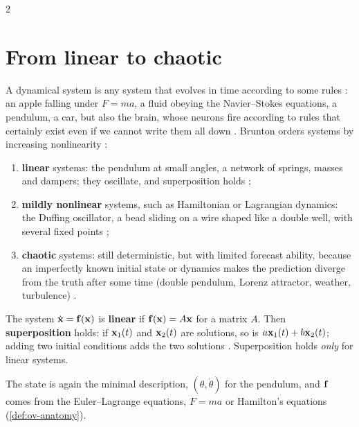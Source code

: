 \begin{paracol}{2}
\section{From linear to chaotic}\label{sec:fu-progression}

A dynamical system is any system that evolves in time according to some rules
: an apple falling under $F=ma$, a fluid obeying the Navier--Stokes equations, a
pendulum, a car, but also the brain, whose neurons fire according to rules that certainly exist even if
we cannot write them all down . Brunton orders systems by increasing
nonlinearity :
\begin{enumerate}
  \item \textbf{linear} systems: the pendulum at small angles, a network of springs, masses and dampers;
        they oscillate, and superposition holds ;
  \item \textbf{mildly nonlinear} systems, such as Hamiltonian or Lagrangian dynamics: the Duffing
        oscillator, a bead sliding on a wire shaped like a double well, with several fixed points
        ;
  \item \textbf{chaotic} systems: still deterministic, but with limited forecast ability, because an
        imperfectly known initial state or dynamics makes the prediction diverge from the truth after
        some time (double pendulum, Lorenz attractor, weather, turbulence) .
\end{enumerate}

\begin{definition}
The system $\dot{\mathbf{x}}=\mathbf{f}(\mathbf{x})$ is \textbf{linear} if $\mathbf{f}(\mathbf{x})=A\mathbf{x}$ for a matrix $A$. Then
\textbf{superposition} holds: if $\mathbf{x}_1(t)$ and $\mathbf{x}_2(t)$ are solutions, so is
$a\mathbf{x}_1(t)+b\mathbf{x}_2(t)$; adding two initial conditions adds the two solutions .
Superposition holds \emph{only} for linear systems.
\end{definition}

The state is again the minimal description, $(\theta,\dot\theta)$ for the pendulum, and $\mathbf{f}$ comes
from the Euler--Lagrange equations, $F=ma$ or Hamilton's equations 
(\cref{def:ov-anatomy}).


\end{paracol}
